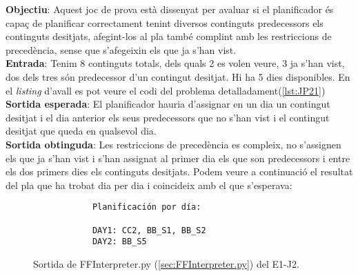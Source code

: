 \documentclass[a4paper]{article}
\begin{document}
	\noindent \textbf{Objectiu}: Aquest joc de prova està dissenyat per avaluar si el planificador és capaç de planificar correctament tenint diversos continguts predecessors els continguts desitjats, afegint-los al pla també complint amb les restriccions de precedència, sense que s'afegeixin els que ja s'han vist. \\
	
	\noindent \textbf{Entrada}: Tenim 8 continguts totals, dels quals 2 es volen veure, 3 ja s'han vist, dos dels tres són predecessor d'un contingut desitjat. Hi ha 5 dies disponibles. En el \textit{listing} d'avall es pot veure el codi del problema detalladament(\ref{lst:JP21}) \\
	
	\noindent \textbf{Sortida esperada}: El planificador hauria d'assignar en un dia un contingut desitjat i el dia anterior els seus predecessors que no s'han vist i el contingut desitjat que queda en qualsevol dia. \\
	
	\noindent \textbf{Sortida obtinguda}: Les restriccions de 
	precedència es compleix, no s'assignen els que ja s'han vist i s'han assignat al primer dia els que son predecessors i entre els dos primers dies els continguts desitjats. Podem veure a continuació el resultat del pla que ha trobat dia per dia i coincideix amb el que s'esperava:
	
	\begin{figure}[H]
		\centering
		\begin{verbatim}
			Planificación por día:
			
			DAY1: CC2, BB_S1, BB_S2
			DAY2: BB_S5
		\end{verbatim}
		\caption{Sortida de FFInterpreter.py (\ref{sec:FFInterpreter.py}) del E1-J2.}
	\end{figure}	
	
\end{document}
